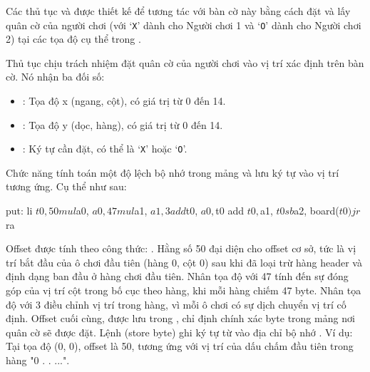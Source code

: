 Các thủ tục  và  được thiết kế để tương tác với bàn cờ này bằng cách đặt và lấy quân cờ của người chơi (với `\texttt{X}' dành cho Người chơi 1 và `\texttt{O}' dành cho Người chơi 2) tại các tọa độ cụ thể trong .

Thủ tục  chịu trách nhiệm đặt quân cờ của người chơi vào vị trí xác định trên bàn cờ. Nó nhận ba đối số:
\begin{itemize}
    \item {}: Tọa độ x (ngang, cột), có giá trị từ 0 đến 14.
    \item {}: Tọa độ y (dọc, hàng), có giá trị từ 0 đến 14.
    \item {}: Ký tự cần đặt, có thể là `\texttt{X}' hoặc `\texttt{O}'.
\end{itemize}
Chức năng tính toán một độ lệch bộ nhớ trong mảng  và lưu ký tự vào vị trí tương ứng. Cụ thể như sau:
\begin{code}
put:
    li $t0, 50
    mul $a0, $a0, 47
    mul $a1, $a1, 3
    add $t0, $a0, $t0
    add $t0, $a1, $t0
    sb $a2, board($t0)

    jr $ra
\end{code}

Offset được tính theo công thức: . Hằng số 50 đại diện cho offset cơ sở, tức là vị trí bắt đầu của ô chơi đầu tiên (hàng 0, cột 0) sau khi đã loại trừ hàng header và định dạng ban đầu ở hàng chơi đầu tiên. Nhân tọa độ  với 47 tính đến sự đóng góp của vị trí cột trong bố cục theo hàng, khi mỗi hàng chiếm 47 byte. Nhân tọa độ  với 3 điều chỉnh vị trí trong hàng, vì mỗi ô chơi có sự dịch chuyển vị trí cố định. Offset cuối cùng, được lưu trong , chỉ định chính xác byte trong mảng  nơi quân cờ sẽ được đặt. Lệnh  (store byte) ghi ký tự từ  vào địa chỉ bộ nhớ . Ví dụ: Tại tọa độ (0, 0), offset là 50, tương ứng với vị trí của dấu chấm đầu tiên trong hàng "0  .  .  ...".